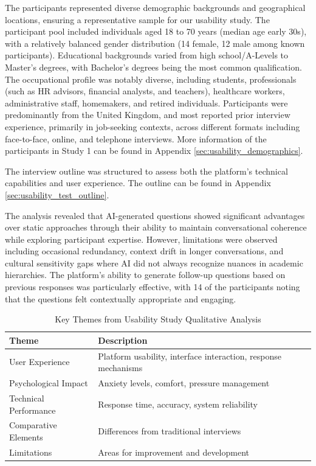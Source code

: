 \documentclass[sigchi,nonacm,manuscript]{acmart}
\begin{document}
The participants represented diverse demographic backgrounds and geographical locations, ensuring a representative sample for our usability study. The participant pool included individuals aged 18 to 70 years (median age early 30s), with a relatively balanced gender distribution (14 female, 12 male among known participants). Educational backgrounds varied from high school/A-Levels to Master's degrees, with Bachelor's degrees being the most common qualification. The occupational profile was notably diverse, including students, professionals (such as HR advisors, financial analysts, and teachers), healthcare workers, administrative staff, homemakers, and retired individuals. Participants were predominantly from the United Kingdom, and most reported prior interview experience, primarily in job-seeking contexts, across different formats including face-to-face, online, and telephone interviews. More information of the participants in Study 1 can be found in Appendix \ref{sec:usability_demographics}.

The interview outline was structured to assess both the platform's technical capabilities and user experience. The outline can be found in Appendix \ref{sec:usability_test_outline}.

The analysis revealed that AI-generated questions showed significant advantages over static approaches through their ability to maintain conversational coherence while exploring participant expertise. However, limitations were observed including occasional redundancy, context drift in longer conversations, and cultural sensitivity gaps where AI did not always recognize nuances in academic hierarchies. The platform's ability to generate follow-up questions based on previous responses was particularly effective, with 14 of the participants noting that the questions felt contextually appropriate and engaging. 

\begin{table}[h]
\caption{Key Themes from Usability Study Qualitative Analysis}
\label{tab:usability_themes}
\small
\begin{tabular}{@{}p{4cm}|p{8cm}@{}}
\toprule
\textbf{Theme} & \textbf{Description} \\
\midrule
User Experience & Platform usability, interface interaction, response mechanisms \\
Psychological Impact & Anxiety levels, comfort, pressure management \\
Technical Performance & Response time, accuracy, system reliability \\
Comparative Elements & Differences from traditional interviews \\
Limitations & Areas for improvement and development \\
\bottomrule
\end{tabular}
\end{table}
\end{document}
